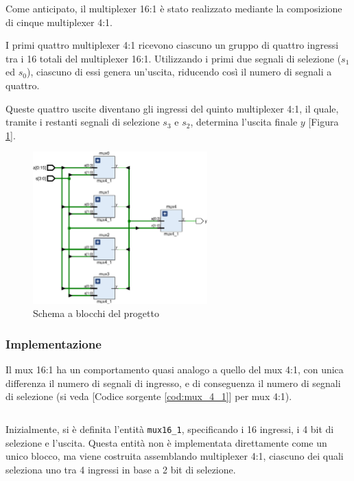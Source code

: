 Come anticipato, il multiplexer 16:1 è stato realizzato mediante la composizione di cinque multiplexer 4:1.

I primi quattro multiplexer 4:1 ricevono ciascuno un gruppo di quattro ingressi tra i 16 totali del multiplexer 16:1. Utilizzando i primi due segnali di selezione ($s_1$ ed $s_0$), ciascuno di essi genera un'uscita, riducendo così il numero di segnali a quattro.

Queste quattro uscite diventano gli ingressi del quinto multiplexer 4:1, il quale, tramite i restanti segnali di selezione $s_3$ e $s_2$, determina l'uscita finale $y$ [Figura \ref{fig:1_1_MUX_16_1}].

\begin{figure}[h]
    \centering
    \includegraphics[width=0.6\textwidth]{img/1_1_MUX_16_1.pdf}
    \caption{Schema a blocchi del progetto}
    \label{fig:1_1_MUX_16_1}
\end{figure}

\subsubsection{Implementazione}
Il mux 16:1 ha un comportamento quasi analogo a quello del mux 4:1, con unica differenza il numero di segnali di ingresso, e di conseguenza il numero di segnali di selezione (si veda [Codice sorgente \ref{cod:mux_4_1}] per mux 4:1).

\begin{code}
    \inputminted{vhdl}{vhdl/mux16_1.vhd}
    \caption{Implementazione del multiplexer 16:1}
    \label{cod:mux16_1}
\end{code}

Inizialmente, si è definita l’entità \texttt{mux16\_1}, specificando i 16 ingressi, i 4 bit di selezione e l’uscita. Questa entità non è implementata direttamente come un unico blocco, ma viene costruita assemblando multiplexer 4:1, ciascuno dei quali seleziona uno tra 4 ingressi in base a 2 bit di selezione.

